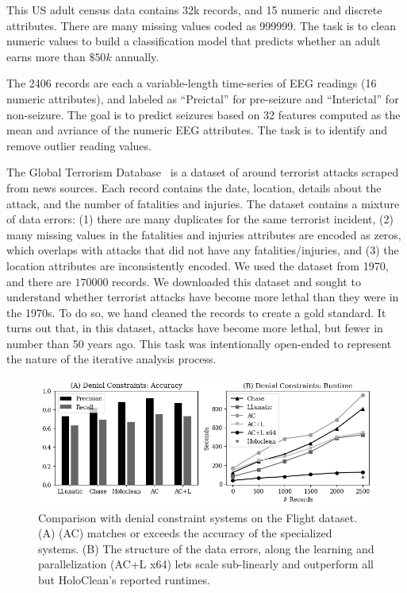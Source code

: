  This US adult census data contains 32k records, and 15 numeric and discrete attributes.  There are many missing values coded as 999999.  The task is to clean numeric values to build a classification model that predicts whether an adult earns more than $\$50k$ annually. 

  The 2406 records are each a variable-length time-series of EEG readings (16 numeric attributes), and labeled as ``Preictal'' for pre-seizure and ``Interictal'' for non-seizure.  The goal is to predict seizures based on 32 features computed as the mean and avriance of the numeric EEG attributes.  The task is to identify and remove outlier reading values.  

 The Global Terrorism Database~\cite{data-terrorism} is a dataset of around terrorist attacks scraped from news sources.  Each record contains the date, location, details about the attack, and the number of fatalities and injuries.  The dataset contains a mixture of data errors:
(1) there are many duplicates for the same terrorist incident,
(2) many missing values in the fatalities and injuries attributes are encoded as zeros, which overlaps with attacks that did not have any fatalities/injuries, and
(3) the location attributes are inconsistently encoded.  
We used the dataset from 1970, and there are $170000$ records.  
We downloaded this dataset and sought to understand whether terrorist attacks have become more lethal than they were in the 1970s.  To do so, we hand cleaned the records to create a gold standard.  It turns out that, in this dataset, attacks have become more lethal, but fewer in number than 50 years ago.  This task was intentionally open-ended to represent the nature of the iterative analysis process.


\begin{figure}
    \centering
    \includegraphics[width=\columnwidth]{exp/exp1.png}
    \caption{\small Comparison with denial constraint systems on the Flight dataset.  (A) \sys (AC) matches or exceeds the accuracy of the specialized systems.  (B) The structure of the data errors, along the learning and parallelization (AC+L x64) lets \sys scale sub-linearly and outperform all but HoloClean's reported runtimes.  \label{exp1a}}
\end{figure}

